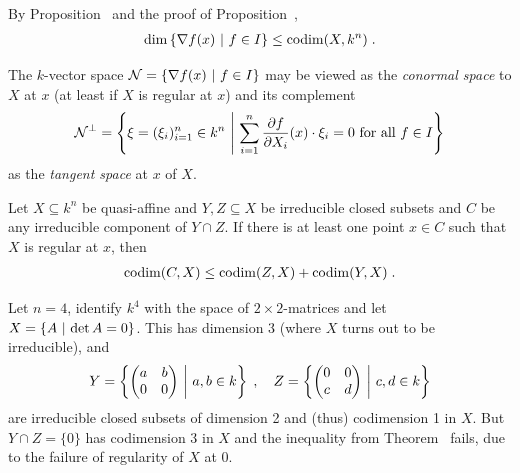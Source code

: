 \documentclass[a4paper,parskip=half,numbers=enddot, DIV=12]{scrreprt}
\begin{document}
		
\begin{rem*}
    By Proposition~ and the proof of Proposition~, 
    \begin{align*}
        \dim\left\{\nabla f(x)\ \middle|\  f\in I\right\} \leq \operatorname{codim}(X,k^n)\;.
    \end{align*}
\end{rem*}
\begin{rem}
    The $k$-vector space $\mathcal{N} = \left\{\nabla f(x) \ \middle|\  f\in I\right\}$ may be viewed as the \emph{conormal space} to $X$ at $x$ (at least if $X$ is regular at $x$) and its complement 
    \begin{align*}
        \mathcal{N}^\perp = \left\{ \xi = (\xi_i)_{i=1}^n \in k^n \ \middle|\  \sum_{i=1}^{n}\frac{\partial f}{\partial X_i}(x)\cdot\xi_i=0 \text{ for all } f\in I\right\}
    \end{align*}
    as the \emph{tangent space} at $x$ of $X$.
\end{rem}
\begin{thm}
    Let $X\subseteq k^n$ be quasi-affine and $Y,Z \subseteq X$ be irreducible closed subsets and $C$ be any irreducible component of $Y\cap Z$. If there is at least one point $x\in C$ such that $X$ is regular at $x$, then 
    \begin{align*}
    	\operatorname{codim}(C,X) \leq \operatorname{codim} (Z,X)+\operatorname{codim}(Y,X)\;.
    \end{align*}
\end{thm}
\begin{rem}
    Let $n=4$, identify $k^4$ with the space of $2\times 2$-matrices and let $X= \left\{ A\ \middle|\  \operatorname{det} A = 0\right\}$. This has dimension 3 (where $X$ turns out to be irreducible), and 
    \begin{align*}
        Y = \left\{\begin{pmatrix} a&b\\ 0&0\end{pmatrix} \ \middle|\  a,b\in k \right\}\;,\quad
        Z = \left\{\begin{pmatrix} 0&0\\ c&d\end{pmatrix} \ \middle|\  c,d\in k \right\}
    \end{align*}  
    are irreducible closed subsets of dimension 2 and (thus) codimension 1 in $X$. But $Y\cap Z = \{0\}$ has codimension 3 in $X$ and the inequality from Theorem~ fails, due to the failure of regularity of $X$ at $0$.
\end{rem}
\end{document}
